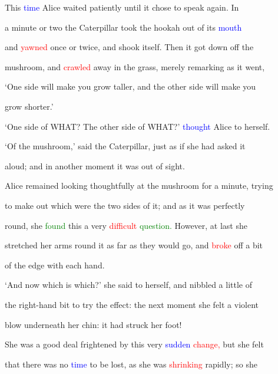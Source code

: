  This \textcolor{blue}{time} Alice \textcolor{BurntOrange}{waited} patiently until it chose to speak again. In

 a minute or two the Caterpillar took the hookah out of its \textcolor{blue}{mouth}

 and \textcolor{red}{yawned} once or twice, and shook itself. Then it got down off the

 mushroom, and \textcolor{red}{crawled} away in the grass, merely remarking as it went,

 ‘One side will make you \textcolor{BurntOrange}{grow} taller, and the other side will make you

 \textcolor{BurntOrange}{grow} shorter.’



 ‘One side of WHAT? The other side of WHAT?’ \textcolor{blue}{thought} Alice to herself.



 ‘Of the mushroom,’ said the Caterpillar, just as if she had asked it

 aloud; and in another moment it was out of sight.



 Alice remained looking thoughtfully at the mushroom for a minute, trying

 to make out which were the two sides of it; and as it was perfectly

 round, she \textcolor{green}{found} this a very \textcolor{red}{difficult} \textcolor{green}{question.} However, at last she

 stretched her arms round it as far as they would go, and \textcolor{red}{broke} off a bit

 of the edge with each hand.



 ‘And now which is which?’ she said to herself, and nibbled a little of

 the right-hand bit to try the effect: the next moment she felt a \textcolor{BurntOrange}{violent}

 blow underneath her chin: it had struck her foot!



 She was a \textcolor{BurntOrange}{good} \textcolor{BurntOrange}{deal} \textcolor{BurntOrange}{frightened} by this very \textcolor{blue}{sudden} \textcolor{red}{change,} but she felt

 that there was no \textcolor{blue}{time} to be \textcolor{BurntOrange}{lost,} as she was \textcolor{red}{shrinking} rapidly; so she


